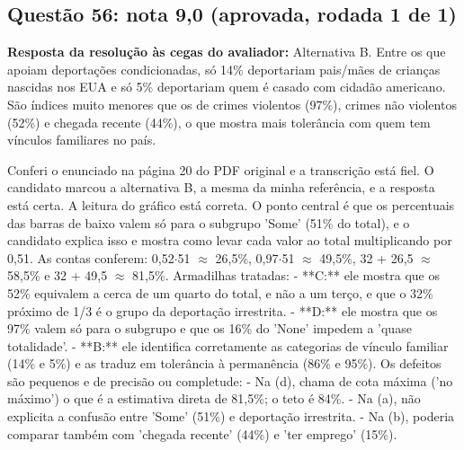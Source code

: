 \documentclass{article}%
\begin{document}
\subsection*{Questão 56: nota 9,0 (aprovada, rodada 1 de 1)}%
\textbf{Resposta da resolução às cegas do avaliador:} Alternativa B. Entre os que apoiam deportações condicionadas, só 14\% deportariam pais/mães de crianças nascidas nos EUA e só 5\% deportariam quem é casado com cidadão americano. São índices muito menores que os de crimes violentos (97\%), crimes não violentos (52\%) e chegada recente (44\%), o que mostra mais tolerância com quem tem vínculos familiares no país.\par %
Conferi o enunciado na página 20 do PDF original e a transcrição está fiel. O candidato marcou a alternativa B, a mesma da minha referência, e a resposta está certa.\newline%
\newline%
A leitura do gráfico está correta. O ponto central é que os percentuais das barras de baixo valem só para o subgrupo 'Some' (51\% do total), e o candidato explica isso e mostra como levar cada valor ao total multiplicando por 0,51. As contas conferem: 0,52$\cdot$51 $\approx$ 26,5\%, 0,97$\cdot$51 $\approx$ 49,5\%, 32 + 26,5 $\approx$ 58,5\% e 32 + 49,5 $\approx$ 81,5\%.\newline%
\newline%
Armadilhas tratadas:\newline%
{-} **C:** ele mostra que os 52\% equivalem a cerca de um quarto do total, e não a um terço, e que o 32\% próximo de 1/3 é o grupo da deportação irrestrita.\newline%
{-} **D:** ele mostra que os 97\% valem só para o subgrupo e que os 16\% do 'None' impedem a 'quase totalidade'.\newline%
{-} **B:** ele identifica corretamente as categorias de vínculo familiar (14\% e 5\%) e as traduz em tolerância à permanência (86\% e 95\%).\newline%
\newline%
Os defeitos são pequenos e de precisão ou completude:\newline%
{-} Na (d), chama de cota máxima ('no máximo') o que é a estimativa direta de 81,5\%; o teto é 84\%.\newline%
{-} Na (a), não explicita a confusão entre 'Some' (51\%) e deportação irrestrita.\newline%
{-} Na (b), poderia comparar também com 'chegada recente' (44\%) e 'ter emprego' (15\%).\newline%
\end{document}
